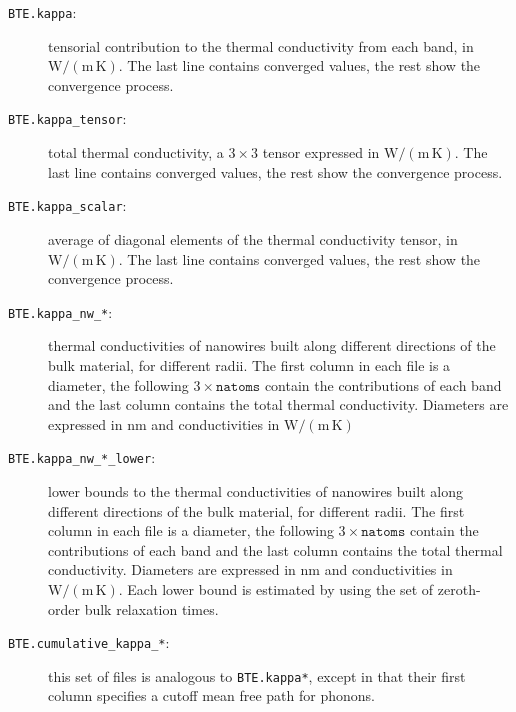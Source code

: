 \documentclass[a4paper,10pt,english]{article}
\begin{document}
\begin{description}
\item[\texttt{BTE.kappa}:] tensorial contribution to the thermal conductivity from each band, in $\mathrm{W/\left(m\,K\right)}$. The last line contains converged values, the rest show the convergence process.
\item[\texttt{BTE.kappa\_tensor}:] total thermal conductivity, a $3\times 3$ tensor expressed in $\mathrm{W/\left(m\,K\right)}$. The last line contains converged values, the rest show the convergence process.
\item[\texttt{BTE.kappa\_scalar}:] average of diagonal elements of the thermal conductivity tensor, in $\mathrm{W/\left(m\,K\right)}$. The last line contains converged values, the rest show the convergence process.
\item[\texttt{BTE.kappa\_nw\_*}:] thermal conductivities of nanowires built along different directions of the bulk material, for different radii. The first column in each file is a diameter, the following $3\times\mathtt{natoms}$ contain the contributions of each band and the last column contains the total thermal conductivity. Diameters are expressed in $\mathrm{nm}$ and conductivities in $\mathrm{W/\left(m\,K\right)}$
\item[\texttt{BTE.kappa\_nw\_*\_lower}:] lower bounds to the thermal conductivities of nanowires built along different directions of the bulk material, for different radii. The first column in each file is a diameter, the following $3\times\mathtt{natoms}$ contain the contributions of each band and the last column contains the total thermal conductivity. Diameters are expressed in $\mathrm{nm}$ and conductivities in $\mathrm{W/\left(m\,K\right)}$. Each lower bound is estimated by using the set of zeroth-order bulk relaxation times.
\item[\texttt{BTE.cumulative\_kappa\_*}:] this set of files is analogous to \texttt{BTE.kappa*}, except in that their first column specifies a cutoff mean free path for phonons.
\end{description}
\end{document}
